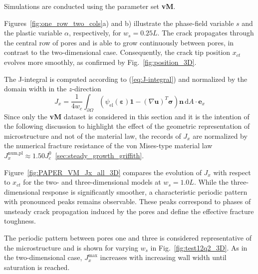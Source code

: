 \documentclass[pdflatex,sn-mathphys-num]{sn-jnl}%
\newcommand{\vMLabel}{\textbf{vM}\xspace}
\theoremstyle{thmstyleone}%
\theoremstyle{thmstyletwo}%
\theoremstyle{thmstylethree}%
\begin{document}
Simulations are conducted  using the parameter set \vMLabel.

Figures~\ref{fig:one_row_two_cols}a) and b) illustrate the phase-field variable $s$ and the plastic variable $\alpha$, respectively, for $w_s=0.25L$. The crack propagates through the central row of pores and is able to grow continuously between pores, in contrast to the two-dimensional case. Consequently, the crack tip position $x_{ct}$ evolves more smoothly, as confirmed by Fig.~\ref{fig:position_3D}.

The J-integral is computed according to (\ref{eq:J-integral}) and normalized by the domain width in the $z$-direction
\begin{equation}
    J_x = \dfrac{1}{4 w_c}\int_{\partial\Omega}\left(\psi_{\text{el}}(\boldsymbol{\varepsilon})\boldsymbol{1} - (\nabla\boldsymbol{u})^T\boldsymbol{\sigma}\right)\boldsymbol{n}\,\mathrm{d}A\cdot\boldsymbol{e}_x
\end{equation}
Since only the \vMLabel dataset is considered in this section and it is the intention of the following discussion
to highlight the effect of the geometric representation of microstructure and 
not of the material law, the records of $J_x$ are normalized by the 
numerical fracture resistance of the von Mises-type material law $J_x^{\text{num,pl}}\approx1.50J_c^0$~\ref{sec:steady_growth_griffith}.

Figure~\ref{fig:PAPER_VM_Jx_all_3D} compares the evolution of $J_x$ with respect to $x_{ct}$ for the two- and three-dimensional models at $w_s=1.0L$. While the three-dimensional response is significantly smoother, a characteristic periodic pattern with pronounced peaks remains observable. These peaks correspond to phases of unsteady crack propagation induced by the pores and define the effective fracture toughness.

The periodic pattern between pores one and three
 is considered representative of the microstructure and is shown for varying $w_s$ in Fig.~\ref{fig:test12q2_3D}. As in the two-dimensional case, $J_x^{\text{max}}$ increases with increasing wall width until saturation is reached.
\end{document}
